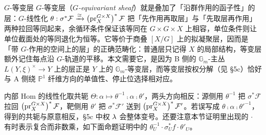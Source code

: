 \begin{conceptbox}{$G$-等变层}
$G$-等变层（\emph{$G$-equivariant sheaf}）就是叠加了「沿群作用的函子性」的层：$G$-线性化 $\theta:\sigma^*\mathcal{F}\xrightarrow{\cong}\left(\operatorname{\operatorname{pr}}_X^{G\times X}\right)^*\mathcal{F}$ 把「先作用再取层」与「先取层再作用」两种拉回等同起来，余循环条件保证该等同在 $G\times G\times X$ 上相容，单位条件则让单位截面处的等同退化为恒等。它等价于商叠 $[X/G]$ 上的拟凝聚层，因而是「带 $G$-作用的空间上的层」的正确范畴化：普通层只记得 $X$ 的局部结构，等变层额外记住每点沿 $G$-轨道的平移。本文需要它，是因为 B 侧的 $\mathbb{G}_m$-主丛 $L(Y,\xi)^{\times}\to Y$ 上的层正是 $Y$ 上的 $\mathbb{G}_m$-等变层，而等变层按权分解（见 §5c）恰好与 A 侧绕 $\mathbb{P}^1$ 纤维方向的单值性、停止位选择相对应。
\par\smallskip{}
\end{conceptbox}

\begin{yizhu}
内部 Hom 的线性化取共轭 $\Theta:\alpha\mapsto\theta^{-1}\comp\alpha\comp\theta'$，两头方向相反：源侧用 $\theta^{-1}$ 把 $\sigma^*\mathcal{F}$ 拉回 $\left(\operatorname{\operatorname{pr}}_X^{G\times X}\right)^*\mathcal{F}$，靶侧用 $\theta'$ 把 $\sigma^*\mathcal{F}'$ 送到 $\left(\operatorname{\operatorname{pr}}_X^{G\times X}\right)^*\mathcal{F}'$。若误写成 $\theta\comp\alpha\comp\theta'^{-1}$，得到的共轭与原意相反，§5c 中权 $\operatorname{\lambda}$ 会整体变号。还要注意本节证明里出现的 $\cdot$ 有时表示复合而非数乘，如下面命题证明中的 $\theta_U^{-1}\cdot\sigma_U^*f\cdot\theta'_U$。
\end{yizhu}

